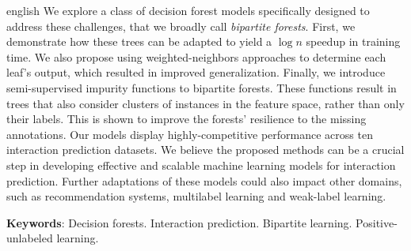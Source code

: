 \begin{resumo}[Abstract]
\begin{otherlanguage*}{english}
	We explore a class of decision forest models specifically designed to address these challenges, that we broadly call \emph{bipartite forests}. First, we demonstrate how these trees can be adapted to yield a $\log n$ speedup in training time. We also propose using weighted-neighbors approaches to determine each leaf's output, which resulted in improved generalization. Finally, we introduce semi-supervised impurity functions to bipartite forests. These functions result in trees that also consider clusters of instances in the feature space, rather than only their labels. This is shown to improve the forests' resilience to the missing annotations.
	Our models display highly-competitive performance across ten interaction prediction datasets.
	We believe the proposed methods can be a crucial step in developing effective and scalable machine learning models for interaction prediction.
	Further adaptations of these models could also impact other domains, such as recommendation systems, multilabel learning and weak-label learning.


   \vspace{\onelineskip}
 
   \noindent 
   \textbf{Keywords}: Decision forests. Interaction prediction. Bipartite learning. Positive-unlabeled learning. 
 \end{otherlanguage*}
\end{resumo}
